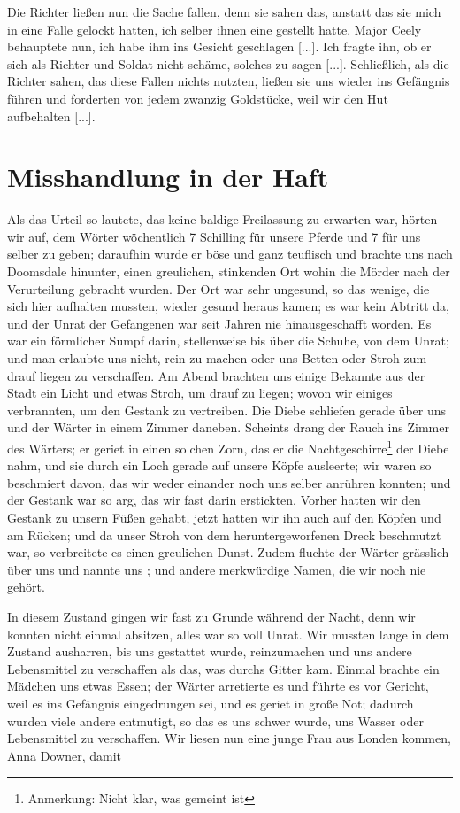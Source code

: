 Die Richter ließen nun die Sache fallen,
denn sie sahen das, anstatt das sie mich in eine Falle gelockt hatten,
ich selber ihnen eine gestellt hatte. Major Ceely behauptete nun,
ich habe ihm ins Gesicht geschlagen [...]. Ich fragte ihn, ob er
sich als Richter und Soldat nicht schäme, solches zu sagen [...].
Schließlich, als die Richter sahen, das diese Fallen nichts nutzten,
ließen sie uns wieder ins Gefängnis führen und forderten von
jedem zwanzig Goldstücke, weil wir den Hut aufbehalten [...].

\section{Misshandlung in der Haft}

Als das Urteil so lautete, das keine baldige Freilassung
zu erwarten war, hörten wir auf, dem Wörter wöchentlich
7 Schilling für unsere Pferde und 7 für uns selber zu geben;
daraufhin wurde er böse und ganz teuflisch und brachte uns nach
Doomsdale hinunter, einen greulichen, stinkenden 
Ort wohin die
Mörder nach der Verurteilung gebracht wurden. Der Ort war
sehr ungesund, so das wenige, die sich hier aufhalten mussten,
wieder gesund heraus kamen; es war kein Abtritt da, und der
Unrat der Gefangenen war seit Jahren nie hinausgeschafft worden.
Es war ein förmlicher Sumpf darin, stellenweise bis über die
Schuhe, von dem Unrat; und man erlaubte uns nicht, rein zu
machen oder uns Betten oder Stroh zum drauf liegen zu 
verschaffen. Am Abend brachten uns einige Bekannte aus der Stadt
ein Licht und etwas Stroh, um drauf zu liegen; wovon wir einiges
verbrannten, um den Gestank zu vertreiben. Die Diebe schliefen
gerade über uns und der Wärter in einem Zimmer daneben.
Scheints drang der Rauch ins Zimmer des Wärters; er geriet
in einen solchen Zorn, das er die 
Nachtgeschirre\footnote{Anmerkung: Nicht klar, was gemeint 
ist} der Diebe nahm,
und sie durch ein Loch gerade auf unsere Köpfe ausleerte; wir
waren so beschmiert davon, das wir weder einander noch uns selber
anrühren konnten; und der Gestank war so arg, das wir fast
darin erstickten. Vorher hatten wir den Gestank zu unsern Füßen
gehabt, jetzt hatten wir ihn auch auf den Köpfen und am Rücken;
und da unser Stroh von dem heruntergeworfenen Dreck beschmutzt
war, so verbreitete es einen greulichen Dunst. Zudem fluchte der
Wärter grässlich über uns und nannte uns ; und andere merkwürdige Namen, die wir noch nie gehört. 

In
diesem Zustand gingen wir fast zu Grunde während der Nacht,
denn wir konnten nicht einmal absitzen, alles war so voll Unrat.
Wir mussten lange in dem Zustand ausharren, bis uns gestattet
wurde, reinzumachen und uns andere Lebensmittel zu verschaffen als
das, was durchs Gitter kam. Einmal brachte ein Mädchen uns etwas
Essen; der Wärter arretierte es und führte es vor Gericht, weil
es ins Gefängnis eingedrungen sei, und es geriet in große Not;
dadurch wurden viele andere entmutigt, so das es uns schwer
wurde, uns Wasser oder Lebensmittel zu verschaffen. Wir liesen
nun eine junge Frau aus Londen kommen, Anna Downer, damit


